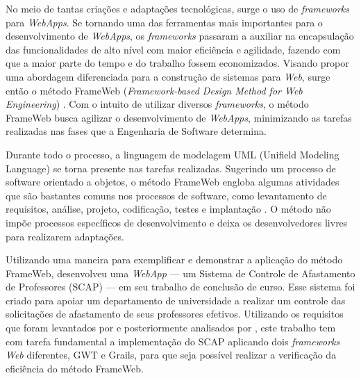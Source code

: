 No meio de tantas criações e adaptações tecnológicas, surge o uso de \textit{frameworks} para \textit{WebApps}. Se tornando uma das ferramentas mais importantes para o desenvolvimento de \textit{WebApps}, os \textit{frameworks} passaram a auxiliar na encapsulação das funcionalidades de alto nível com maior eficiência e agilidade, fazendo com que a maior parte do tempo e do trabalho fossem economizados. Visando propor uma abordagem diferenciada para a construção de sistemas para \textit{Web}, surge então o método FrameWeb (\textit{Framework-based Design Method for Web Engineering}) \cite{souza:masterthesis07}. Com o intuito de utilizar diversos \textit{frameworks}, o método FrameWeb busca agilizar o desenvolvimento de \textit{WebApps}, minimizando as tarefas realizadas nas fases que a Engenharia de Software determina.

Durante todo o processo, a linguagem de modelagem UML (Unifield Modeling Language) \cite{booch-et-al:u06} se torna presente nas tarefas realizadas. Sugerindo um processo de software orientado a objetos, o método FrameWeb engloba algumas atividades que são bastantes comuns nos processos de software, como levantamento de requisitos, análise, projeto, codificação, testes e implantação \cite{souza:masterthesis07}. O método não impõe processos específicos de desenvolvimento e deixa os desenvolvedores livres para realizarem adaptações.

Utilizando uma maneira para exemplificar e demonstrar a aplicação do método FrameWeb,  desenvolveu uma \textit{WebApp} --- um Sistema de Controle de Afastamento de Professores (SCAP) --- em seu trabalho de conclusão de curso. Esse sistema foi criado para apoiar um departamento de universidade a realizar um controle das solicitações de afastamento de seus professores efetivos. Utilizando os requisitos que foram levantados por  e posteriormente analisados por , este trabalho tem com tarefa fundamental a implementação do SCAP aplicando dois \textit{frameworks Web} diferentes, GWT e Grails, para que seja possível realizar a verificação da eficiência do método FrameWeb.
